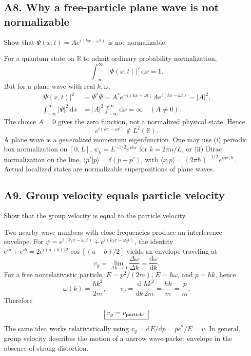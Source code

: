 \documentclass[11pt,a4paper]{article}
\newcommand{\dd}{\mathrm{d}}
\newcommand{\R}{\mathbb R}
\begin{document}
\subsection{A8. Why a free-particle plane wave is not normalizable}
\begin{questionbox}Show that $\Psi(x,t)=Ae^{i(kx-\omega t)}$ is not normalizable.\end{questionbox}
For a quantum state on $\R$ to admit ordinary probability normalization,
\begin{equation}\int_{-\infty}^{\infty}|\Psi(x,t)|^2\,\dd x=1.
\end{equation}
But for a plane wave with real $k,\omega$,
\begin{align}
|\Psi(x,t)|^2&=\Psi^*\Psi
=A^*e^{-i(kx-\omega t)}Ae^{i(kx-\omega t)}=|A|^2,\\
\int_{-\infty}^{\infty}|\Psi|^2\,\dd x&=|A|^2\int_{-\infty}^{\infty}\dd x=\infty\quad(A\ne0).
\end{align}
The choice $A=0$ gives the zero function, not a normalized physical state. Hence
\begin{equation}\boxed{e^{i(kx-\omega t)}\not\in L^2(\R).}
\end{equation}
A plane wave is a \emph{generalized} momentum eigenfunction. One may use (i) periodic box normalization on $[0,L]$, $\psi_k=L^{-1/2}e^{ikx}$ for $k=2\pi n/L$, or (ii) Dirac normalization on the line, $\langle p'|p\rangle=\delta(p-p')$, with $\langle x|p\rangle=(2\pi\hbar)^{-1/2}e^{ipx/\hbar}$. Actual localized states are normalizable superpositions of plane waves.

\subsection{A9. Group velocity equals particle velocity}
\begin{questionbox}Show that the group velocity is equal to the particle velocity.\end{questionbox}
Two nearby wave numbers with close frequencies produce an interference envelope. For $\psi=e^{i(k_1x-\omega_1t)}+e^{i(k_2x-\omega_2t)}$, the identity $e^{ia}+e^{ib}=2e^{i(a+b)/2}\cos[(a-b)/2]$ yields an envelope traveling at
\begin{equation}
v_g=\lim_{\Delta k\to0}\frac{\Delta\omega}{\Delta k}=\frac{\dd\omega}{\dd k}.
\end{equation}
For a free nonrelativistic particle, $E=p^2/(2m)$, $E=\hbar\omega$, and $p=\hbar k$, hence
\begin{equation}
\omega(k)=\frac{\hbar k^2}{2m},\qquad
v_g=\frac{\dd}{\dd k}\frac{\hbar k^2}{2m}=\frac{\hbar k}m=\frac pm.
\end{equation}
Therefore
\begin{equation}\boxed{v_g=v_{\rm particle}.}\end{equation}
The same idea works relativistically using $v_g=\dd E/\dd p=pc^2/E=v$. In general, group velocity describes the motion of a narrow wave-packet envelope in the absence of strong distortion.
\end{document}
